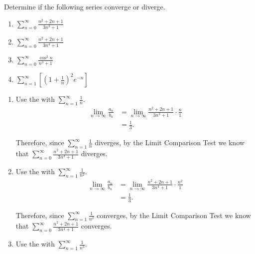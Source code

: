 \documentclass[handout]{ximera}
\begin{document}
\begin{problem}
Determine if the following series converge or diverge.
	\begin{multicols}{2}
	\begin{enumerate}
	
	\item  $\sum_{n=0}^\infty \frac{n^2 + 2n + 1}{3n^3+1}$
	
	\item  $\sum_{n=0}^\infty \frac{n^2+2n+1}{3n^4+1}$
	
	\item  $\sum_{n=0}^\infty \frac{\cos^2 n}{n^3+1}$
	
	\item  $\sum_{n=1}^\infty \left[ \left( 1+\frac{1}{n} \right)^2 e^{-n} \right]$
	
	\end{enumerate}
	\end{multicols}
	
	\begin{freeResponse}
		\begin{enumerate}
		
		\item  Use the  with $\sum_{n=1}^\infty \frac{1}{n}$.
			\begin{align*}
			\lim_{n \to \infty} \frac{a_n}{b_n}
			&= \lim_{n \to \infty} \frac{n^2+2n+1}{3n^3+1} \cdot \frac{n}{1}  \\
			&= \frac{1}{3}.
			\end{align*}
			
		Therefore, since $\sum_{n=1}^\infty \frac{1}{n}$ diverges, by the Limit Comparison Test we know that $\sum_{n=0}^\infty \frac{n^2+2n+1}{3n^3+1}$ diverges.
		
		
		
		\item  Use the  with $\sum_{n=1}^\infty \frac{1}{n^2}$.
			\begin{align*}
			\lim_{n \to \infty} \frac{a_n}{b_n}
			&= \lim_{n \to \infty} \frac{n^2+2n+1}{3n^4+1} \cdot \frac{n^2}{1}  \\
			&= \frac{1}{3}.
			\end{align*}
			
		Therefore, since $\sum_{n=1}^\infty \frac{1}{n^2}$ converges, by the Limit Comparison Test we know that $\sum_{n=0}^\infty \frac{n^2+2n+1}{3n^4+1}$ converges.
		
		
		
		\item  Use the  with $\sum_{n=1}^\infty \frac{1}{n^3}$.  
		

\end{enumerate}
\end{freeResponse}
\end{problem}
\end{document}
